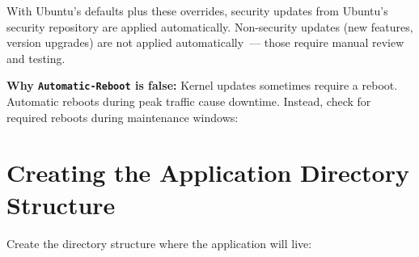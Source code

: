 \noindent{}With Ubuntu's defaults plus these overrides, security updates from Ubuntu's security repository are applied automatically. Non-security updates (new features, version upgrades) are not applied automatically~--- those require manual review and testing.

\textbf{Why \texttt{Automatic-Reboot} is false:} Kernel updates sometimes require a reboot. Automatic reboots during peak traffic cause downtime. Instead, check for required reboots during maintenance windows:

\begin{codebox}[short]

\begin{Shaded}
\begin{Highlighting}[]
\BuiltInTok{[} \BuiltInTok{]} \KeywordTok{\&\&}   \KeywordTok{||}  
\end{Highlighting}
\end{Shaded}

\end{codebox}

\setcounter{section}{7}
\section{Creating the Application Directory Structure}\label{21-system-setup:218-creating-the-application-directory-structure}

Create the directory structure where the application will live:

